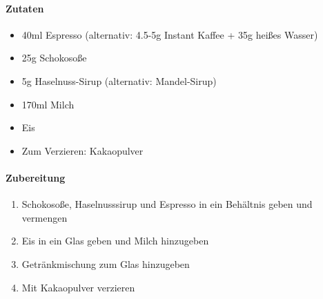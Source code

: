 \clearpage
{}
\label{IcedMocha}

\paragraph{Zutaten}
\begin{itemize}[noitemsep]
	\item 40ml Espresso (alternativ: 4.5-5g Instant Kaffee + 35g heißes Wasser)
	\item 25g Schokosoße
	\item 5g Haselnuss-Sirup (alternativ: Mandel-Sirup)
	\item 170ml Milch
	\item Eis
	\item Zum Verzieren: Kakaopulver
\end{itemize}

\paragraph{Zubereitung}
\begin{enumerate}[noitemsep]
	\item Schokosoße, Haselnusssirup und Espresso in ein Behältnis geben und vermengen
	\item Eis in ein Glas geben und Milch hinzugeben
	\item Getränkmischung zum Glas hinzugeben
	\item Mit Kakaopulver verzieren
\end{enumerate}
